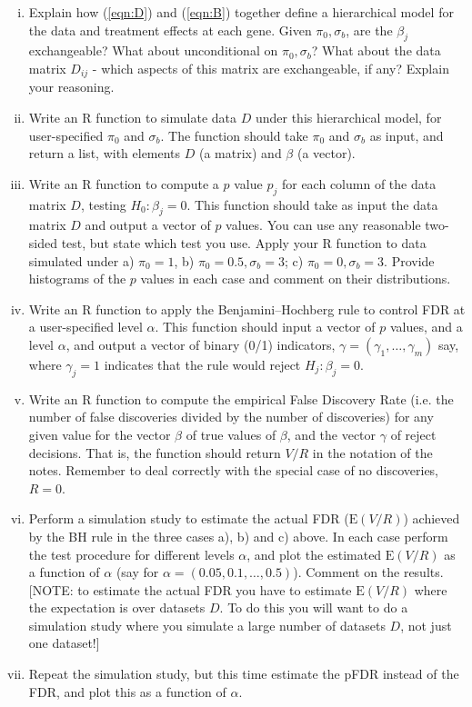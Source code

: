 \documentclass[12pt]{article}
\def\E{\mbox{E}}
\begin{document}
\begin{enumerate}
\begin{enumerate}[i)]
\item Explain how (\ref{eqn:D}) and (\ref{eqn:B}) together define a hierarchical model for the data and treatment effects at each gene.
Given $\pi_0 ,\sigma_b$, are the $\beta_j$ exchangeable? What about unconditional on $\pi_0,\sigma_b$?
What about the data matrix $D_{ij}$ - which aspects of this matrix are exchangeable, if any? Explain your reasoning.
\item Write an R function to simulate data $D$ under this hierarchical model, for user-specified $\pi_0$ and $\sigma_b$. The function
should take $\pi_0$ and $\sigma_b$ as input, and return a list, with elements $D$ (a matrix) and $\beta$ (a vector).
\item Write an R function to compute a $p$ value $p_j$ for each column of the data matrix $D$, testing $H_0:\beta_j=0$.  
This function should take as input the data matrix $D$ and output a vector of $p$ values. You can use any reasonable two-sided test, but state which test
 you use. Apply your R function to data simulated under
a) $\pi_0 = 1$, b) $\pi_0=0.5, \sigma_b=3$; c) $\pi_0=0, \sigma_b=3$. Provide histograms of the $p$ values in each case and comment on their distributions.
\item Write an R function to apply the Benjamini--Hochberg rule to control FDR at a user-specified level $\alpha$.
This function should input a vector of $p$ values, and a level $\alpha$, and output a vector of binary (0/1) indicators, $\gamma=(\gamma_1,\dots,\gamma_m)$ say,
where $\gamma_j=1$ indicates that the rule would reject $H_j: \beta_j=0$.
\item Write an R function to compute the empirical False Discovery Rate (i.e. the number of false discoveries divided by the number of discoveries)
for any given value for the vector $\beta$ of true values of $\beta$, and the vector $\gamma$ of reject decisions. That is, the function should return $V/R$ in the notation of the notes. Remember to deal correctly with the special case of no discoveries, $R=0$.  
\item Perform a simulation study to estimate the actual FDR ($\E(V/R)$) achieved by the BH rule in the three cases a), b) and c) above. In each case
perform the test procedure for different levels $\alpha$, and plot the estimated $\E(V/R)$ as a function of $\alpha$ (say for $\alpha =(0.05,0.1,\dots,0.5)$).
Comment on the results. [NOTE: to estimate the actual FDR you have to estimate $\E(V/R)$ where the expectation is over datasets $D$. To do this you
will want to do a simulation study where you simulate a large number of datasets $D$, not just one dataset!]
\item Repeat the simulation study, but this time estimate the pFDR instead of the FDR, and plot this as a function of $\alpha$.
\end{enumerate}


\end{enumerate}
\end{document}
